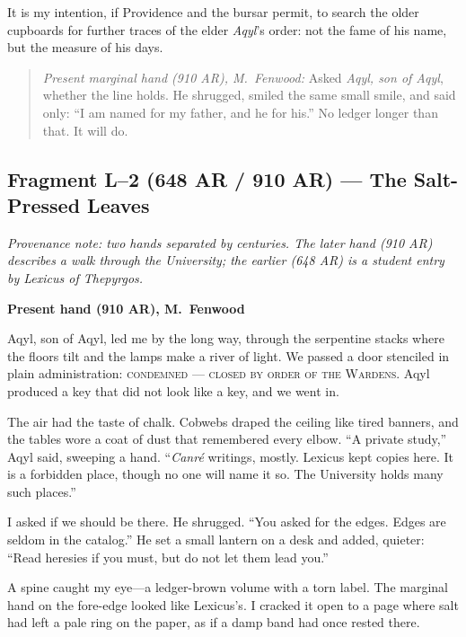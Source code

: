 \documentclass[11pt]{article}
\begin{document}
It is my intention, if Providence and the bursar permit, to search the older cupboards for further traces of the elder \textit{Aqyl}'s order: not the fame of his name, but the measure of his days.

\medskip
\begin{quote}
\textit{Present marginal hand (910 AR), M.\ Fenwood:} Asked \textit{Aqyl, son of Aqyl}, whether the line holds. He shrugged, smiled the same small smile, and said only: ``I am named for my father, and he for his.'' No ledger longer than that. It will do.
\end{quote}

\subsection*{Fragment L--2 (648 AR / 910 AR) --- The Salt-Pressed Leaves}
\label{frag:l2}
{}

\noindent\textit{Provenance note: two hands separated by centuries. The later hand (\textit{910 AR}) describes a walk through the University; the earlier (\textit{648 AR}) is a student entry by Lexicus of Thepyrgos.}

\medskip
\noindent\textbf{Present hand (910 AR), M.\ Fenwood}

Aqyl, son of Aqyl, led me by the long way, through the serpentine stacks where the floors tilt and the lamps make a river of light. We passed a door stenciled in plain administration: \textsc{condemned --- closed by order of the Wardens}. Aqyl produced a key that did not look like a key, and we went in.

The air had the taste of chalk. Cobwebs draped the ceiling like tired banners, and the tables wore a coat of dust that remembered every elbow. ``A private study,'' Aqyl said, sweeping a hand. ``\emph{Canr\'e} writings, mostly. Lexicus kept copies here. It is a forbidden place, though no one will name it so. The University holds many such places.''

I asked if we should be there. He shrugged. ``You asked for the edges. Edges are seldom in the catalog.'' He set a small lantern on a desk and added, quieter: ``Read heresies if you must, but do not let them lead you.''

A spine caught my eye---a ledger-brown volume with a torn label. The marginal hand on the fore-edge looked like Lexicus's. I cracked it open to a page where salt had left a pale ring on the paper, as if a damp band had once rested there.
\end{document}
